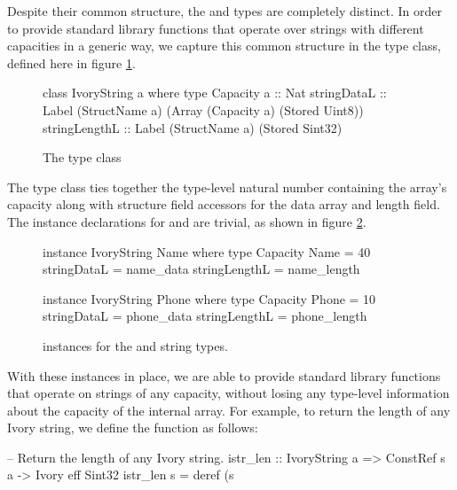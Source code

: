Despite their common structure, the  and  types
are completely distinct. In order to provide standard library
functions that operate over strings with different capacities in a generic
way, we capture this common structure in the  type
class, defined here in figure \ref{ivory-string-class}.

\begin{figure}[h]
\begin{code}
class IvoryString a where
  type Capacity a :: Nat
  stringDataL   :: Label (StructName a)
                         (Array (Capacity a)
                                (Stored Uint8))
  stringLengthL :: Label (StructName a)
                         (Stored Sint32)
\end{code}
\caption{The  type class}
\label{ivory-string-class}
\end{figure}

The  type class ties together the type-level natural
number containing the array's capacity along with structure field accessors
for the data array and length field. The instance declarations for 
and  are trivial, as shown in figure \ref{ivory-string-instances}.

\begin{figure}[h]
\begin{code}
instance IvoryString Name where
  type Capacity Name = 40
  stringDataL = name_data
  stringLengthL = name_length

instance IvoryString Phone where
  type Capacity Phone = 10
  stringDataL = phone_data
  stringLengthL = phone_length
\end{code}
\caption{ instances for the  and 
string types.}
\label{ivory-string-instances}
\end{figure}

With these instances in place, we are able to provide standard library
functions that operate on strings of any capacity, without losing any
type-level information about the capacity of the internal array. For
example, to return the length of any Ivory string, we define the
 function as follows:

\begin{code}
-- Return the length of any Ivory string.
istr_len :: IvoryString a
         => ConstRef s a -> Ivory eff Sint32
istr_len s = deref (s %
\end{code}

